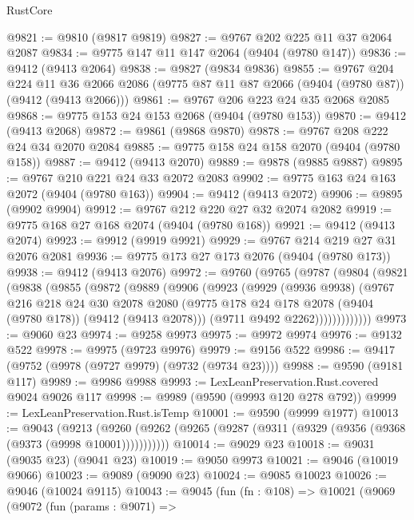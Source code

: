 \begin{lexlean}{RustCore}
\begin{coremodule}
@9821 := @9810 (@9817 @9819)
@9827 := @9767 @202 @225 @11 @37 @2064 @2087
@9834 := @9775 @147 @11 @147 @2064 (@9404 (@9780 @147))
@9836 := @9412 (@9413 @2064)
@9838 := @9827 (@9834 @9836)
@9855 := @9767
    @204
    @224
    @11
    @36
    @2066
    @2086
    (@9775 @87 @11 @87 @2066 (@9404 (@9780 @87)) (@9412 (@9413 @2066)))
@9861 := @9767 @206 @223 @24 @35 @2068 @2085
@9868 := @9775 @153 @24 @153 @2068 (@9404 (@9780 @153))
@9870 := @9412 (@9413 @2068)
@9872 := @9861 (@9868 @9870)
@9878 := @9767 @208 @222 @24 @34 @2070 @2084
@9885 := @9775 @158 @24 @158 @2070 (@9404 (@9780 @158))
@9887 := @9412 (@9413 @2070)
@9889 := @9878 (@9885 @9887)
@9895 := @9767 @210 @221 @24 @33 @2072 @2083
@9902 := @9775 @163 @24 @163 @2072 (@9404 (@9780 @163))
@9904 := @9412 (@9413 @2072)
@9906 := @9895 (@9902 @9904)
@9912 := @9767 @212 @220 @27 @32 @2074 @2082
@9919 := @9775 @168 @27 @168 @2074 (@9404 (@9780 @168))
@9921 := @9412 (@9413 @2074)
@9923 := @9912 (@9919 @9921)
@9929 := @9767 @214 @219 @27 @31 @2076 @2081
@9936 := @9775 @173 @27 @173 @2076 (@9404 (@9780 @173))
@9938 := @9412 (@9413 @2076)
@9972 := @9760
    (@9765
      (@9787
        (@9804
          (@9821
            (@9838
              (@9855
                (@9872
                  (@9889
                    (@9906
                      (@9923
                        (@9929
                          (@9936 @9938)
                          (@9767
                            @216
                            @218
                            @24
                            @30
                            @2078
                            @2080
                            (@9775 @178 @24 @178 @2078 (@9404 (@9780 @178)) (@9412 (@9413 @2078)))
                            (@9711 @9492 @2262)))))))))))))
@9973 := @9060 @23
@9974 := @9258 @9973
@9975 := @9972 @9974
@9976 := @9132 @522
@9978 := @9975 (@9723 @9976)
@9979 := @9156 @522
@9986 := @9417 (@9752 (@9978 (@9727 @9979) (@9732 (@9734 @23))))
@9988 := @9590 (@9181 @117)
@9989 := @9986 @9988
@9993 := LexLeanPreservation.Rust.covered @9024 @9026 @117
@9998 := @9989 (@9590 (@9993 @120 @278 @792))
@9999 := LexLeanPreservation.Rust.isTemp
@10001 := @9590 (@9999 @1977)
@10013 := @9043
    (@9213 (@9260 (@9262 (@9265 (@9287 (@9311 (@9329 (@9356 (@9368 (@9373 (@9998 @10001)))))))))))
@10014 := @9029 @23
@10018 := @9031 (@9035 @23) (@9041 @23)
@10019 := @9050 @9973
@10021 := @9046 (@10019 @9066)
@10023 := @9089 (@9090 @23)
@10024 := @9085 @10023
@10026 := @9046 (@10024 @9115)
@10043 := @9045
    (fun (fn : @108) =>
    @10021
      (@9069
        (@9072
          (fun (params : @9071) =>

\end{coremodule}
\end{lexlean}
